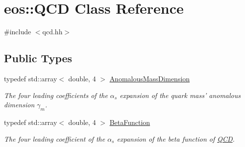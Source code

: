 \hypertarget{classeos_1_1QCD}{
\section{eos::QCD Class Reference}
\label{classeos_1_1QCD}
}


{\ttfamily \#include $<$qcd.hh$>$}\subsection*{Public Types}
\begin{DoxyCompactItemize}
\item 
typedef std::array$<$ double, 4 $>$ \hyperlink{classeos_1_1QCD_a3ca5eea2df0bd5c0043071e14c58d089}{AnomalousMassDimension}
\begin{DoxyCompactList}\small\item\em The four leading coefficients of the $\alpha_s$ expansion of the quark mass' anomalous dimension $\gamma_m$. \item\end{DoxyCompactList}\item 
typedef std::array$<$ double, 4 $>$ \hyperlink{classeos_1_1QCD_a1261bb4643fea3012beb0a9ea78b7dea}{BetaFunction}
\begin{DoxyCompactList}\small\item\em The four leading coefficient of the $\alpha_s$ expansion of the beta function of \hyperlink{classeos_1_1QCD}{QCD}. \item\end{DoxyCompactList}\end{DoxyCompactItemize}
